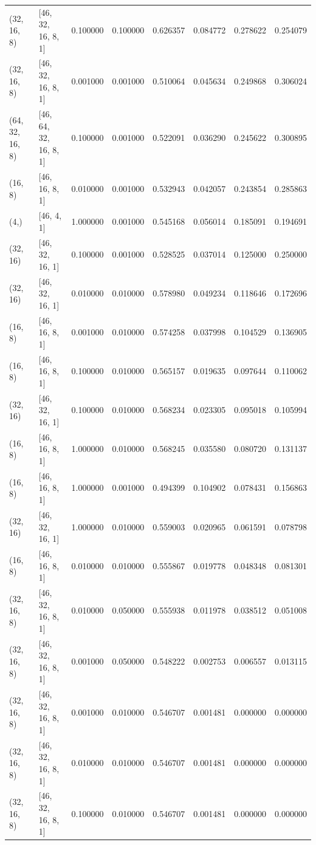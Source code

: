 \documentclass{article}
\begin{document}
\begin{longtable}{llrrrrrr}
(32, 16, 8) & [46, 32, 16, 8, 1] & 0.100000 & 0.100000 & 0.626357 & 0.084772 & 0.278622 & 0.254079 \\
(32, 16, 8) & [46, 32, 16, 8, 1] & 0.001000 & 0.001000 & 0.510064 & 0.045634 & 0.249868 & 0.306024 \\
(64, 32, 16, 8) & [46, 64, 32, 16, 8, 1] & 0.100000 & 0.001000 & 0.522091 & 0.036290 & 0.245622 & 0.300895 \\
(16, 8) & [46, 16, 8, 1] & 0.010000 & 0.001000 & 0.532943 & 0.042057 & 0.243854 & 0.285863 \\
(4,) & [46, 4, 1] & 1.000000 & 0.001000 & 0.545168 & 0.056014 & 0.185091 & 0.194691 \\
(32, 16) & [46, 32, 16, 1] & 0.100000 & 0.001000 & 0.528525 & 0.037014 & 0.125000 & 0.250000 \\
(32, 16) & [46, 32, 16, 1] & 0.010000 & 0.010000 & 0.578980 & 0.049234 & 0.118646 & 0.172696 \\
(16, 8) & [46, 16, 8, 1] & 0.001000 & 0.010000 & 0.574258 & 0.037998 & 0.104529 & 0.136905 \\
(16, 8) & [46, 16, 8, 1] & 0.100000 & 0.010000 & 0.565157 & 0.019635 & 0.097644 & 0.110062 \\
(32, 16) & [46, 32, 16, 1] & 0.100000 & 0.010000 & 0.568234 & 0.023305 & 0.095018 & 0.105994 \\
(16, 8) & [46, 16, 8, 1] & 1.000000 & 0.010000 & 0.568245 & 0.035580 & 0.080720 & 0.131137 \\
(16, 8) & [46, 16, 8, 1] & 1.000000 & 0.001000 & 0.494399 & 0.104902 & 0.078431 & 0.156863 \\
(32, 16) & [46, 32, 16, 1] & 1.000000 & 0.010000 & 0.559003 & 0.020965 & 0.061591 & 0.078798 \\
(16, 8) & [46, 16, 8, 1] & 0.010000 & 0.010000 & 0.555867 & 0.019778 & 0.048348 & 0.081301 \\
(32, 16, 8) & [46, 32, 16, 8, 1] & 0.010000 & 0.050000 & 0.555938 & 0.011978 & 0.038512 & 0.051008 \\
(32, 16, 8) & [46, 32, 16, 8, 1] & 0.001000 & 0.050000 & 0.548222 & 0.002753 & 0.006557 & 0.013115 \\
(32, 16, 8) & [46, 32, 16, 8, 1] & 0.001000 & 0.010000 & 0.546707 & 0.001481 & 0.000000 & 0.000000 \\
(32, 16, 8) & [46, 32, 16, 8, 1] & 0.010000 & 0.010000 & 0.546707 & 0.001481 & 0.000000 & 0.000000 \\
(32, 16, 8) & [46, 32, 16, 8, 1] & 0.100000 & 0.010000 & 0.546707 & 0.001481 & 0.000000 & 0.000000 \\

\end{longtable}
\end{document}
